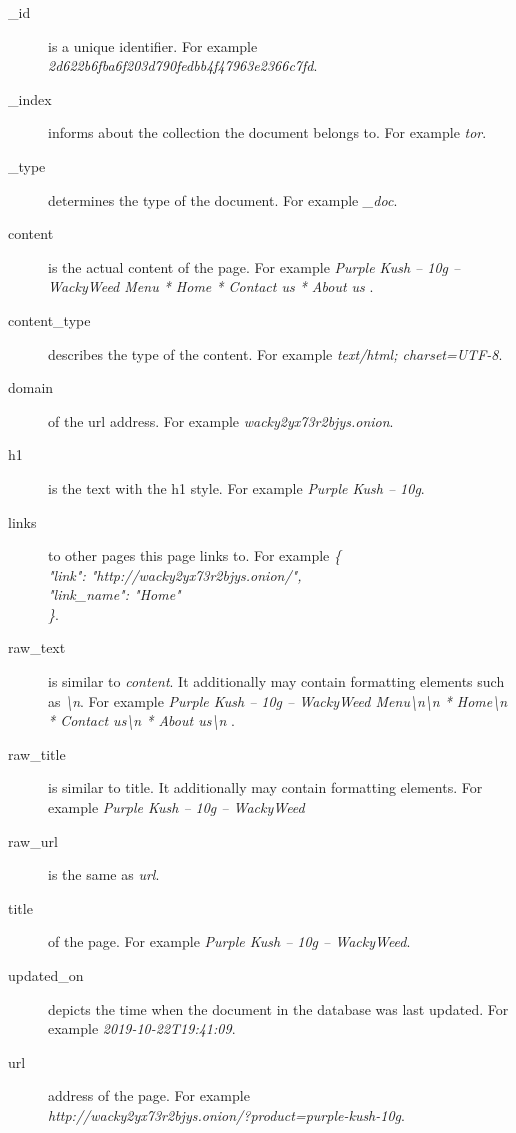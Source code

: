 \begin {description}
	\item[\_id] is a unique identifier. For example\\ \textit{2d622b6fba6f203d790fedbb4f47963e2366c7fd}.
	\item[\_index] informs about the collection the document belongs to. For example \textit{tor}. 
	\item[\_type] determines the type of the document. For example \textit{\_doc}.
	\item[content] is the actual content of the page. For example \textit{Purple Kush – 10g – WackyWeed Menu    * Home   * Contact us   * About us }.
	\item[content\_type] describes the type of the content. For example \textit{text/html; charset=UTF-8}.
	\item[domain] of the url address. For example \textit{wacky2yx73r2bjys.onion}.
	\item[h1] is the text with the h1 style. For example \textit{Purple Kush – 10g}.
	\item[links] to other pages this page links to. For example \textit{\{\\
  "link": "http://wacky2yx73r2bjys.onion/",\\
  "link\_name": "Home"\\
\}}.
	\item[raw\_text] is similar to \textit{content}. It additionally may contain formatting elements such as \textit{\textbackslash n}. For example \textit{Purple Kush – 10g – WackyWeed Menu\textbackslash n\textbackslash n  * Home\textbackslash n  * Contact us\textbackslash n  * About us\textbackslash n }.
	\item[raw\_title] is similar to title. It additionally may contain formatting elements. For example \textit{Purple Kush – 10g – WackyWeed}
	\item[raw\_url] is the same as \textit{url}.
	\item[title] of the page. For example \textit{Purple Kush – 10g – WackyWeed}.
	\item[updated\_on] depicts the time when the document in the database was last updated. For example \textit{2019-10-22T19:41:09}.
	\item[url] address of the page. For example \\ \textit{http://wacky2yx73r2bjys.onion/?product=purple-kush-10g}.
\end{description}